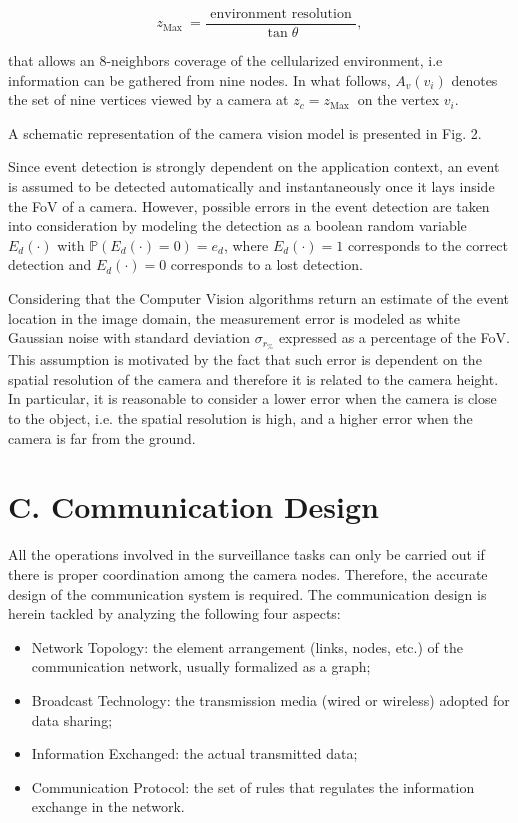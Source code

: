 \documentclass[conference]{IEEEtran}
\begin{document}
\begin{equation*}
z_{\text {Max }}=\frac{\text { environment resolution }}{\tan \theta}, \tag{2}
\end{equation*}


that allows an 8-neighbors coverage of the cellularized environment, i.e information can be gathered from nine nodes. In what follows, $A_{v}\left(v_{i}\right)$ denotes the set of nine vertices viewed by a camera at $z_{c}=z_{\text {Max }}$ on the vertex $v_{i}$.

A schematic representation of the camera vision model is presented in Fig. 2.

Since event detection is strongly dependent on the application context, an event is assumed to be detected automatically and instantaneously once it lays inside the FoV of a camera. However, possible errors in the event detection are taken into consideration by modeling the detection as a boolean random variable $E_{d}(\cdot)$ with $\mathbb{P}\left(E_{d}(\cdot)=0\right)=e_{d}$, where $E_{d}(\cdot)=1$ corresponds to the correct detection and $E_{d}(\cdot)=0$ corresponds to a lost detection.

Considering that the Computer Vision algorithms return an estimate of the event location in the image domain, the measurement error is modeled as white Gaussian noise with standard deviation $\sigma_{r_{\%}}$ expressed as a percentage of the FoV. This assumption is motivated by the fact that such error is dependent on the spatial resolution of the camera and therefore it is related to the camera height. In particular, it is reasonable to consider a lower error when the camera is close to the object, i.e. the spatial resolution is high, and a higher error when the camera is far from the ground.

\section*{C. Communication Design}
All the operations involved in the surveillance tasks can only be carried out if there is proper coordination among the camera nodes. Therefore, the accurate design of the communication system is required. The communication design is herein tackled by analyzing the following four aspects:

\begin{itemize}
  \item Network Topology: the element arrangement (links, nodes, etc.) of the communication network, usually formalized as a graph;
  \item Broadcast Technology: the transmission media (wired or wireless) adopted for data sharing;
  \item Information Exchanged: the actual transmitted data;
  \item Communication Protocol: the set of rules that regulates the information exchange in the network.
\end{itemize}
\end{document}
